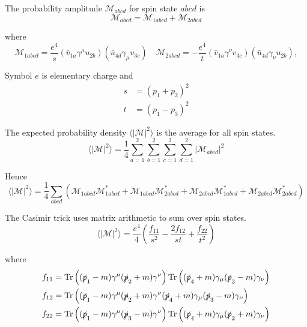 The probability amplitude $\mathcal M_{abcd}$ for spin state $abcd$ is
\begin{equation*}
\mathcal M_{abcd}=\mathcal M_{1abcd}+\mathcal M_{2abcd}
\end{equation*}

where
\begin{equation*}
\mathcal M_{1abcd}=\frac{e^4}{s}(\bar{v}_{1a}\gamma^\mu u_{2b})(\bar{u}_{4d}\gamma_\mu v_{3c})
\quad
\mathcal M_{2abcd}=-\frac{e^4}{t}(\bar{v}_{1a}\gamma^\nu v_{3c})(\bar{u}_{4d}\gamma_\nu u_{2b}),
\end{equation*}

Symbol $e$ is elementary charge and
\begin{align*}
s&=(p_1+p_2)^2
\\
t&=(p_1-p_3)^2
\end{align*}

The expected probability density $\langle|\mathcal M|^2\rangle$
is the average for all spin states.
\begin{equation*}
\langle|\mathcal M|^2\rangle=\frac{1}{4}
\sum_{a=1}^2\sum_{b=1}^2\sum_{c=1}^2\sum_{d=1}^2
|\mathcal M_{abcd}|^2
\end{equation*}

Hence
\begin{equation*}
\langle|\mathcal{M}|^2\rangle=\frac{1}{4}
\sum_{abcd}
\left(
\mathcal M_{1abcd}\mathcal M_{1abcd}^*
+\mathcal M_{1abcd}\mathcal M_{2abcd}^*
+\mathcal M_{2abcd}\mathcal M_{1abcd}^*
+\mathcal M_{2abcd}\mathcal M_{2abcd}^*
\right)
\end{equation*}

The Casimir trick uses matrix arithmetic to sum over spin states.
\begin{equation*}
\langle|\mathcal{M}|^2\rangle
=\frac{e^4}{4}
\left(
\frac{f_{11}}{s^2}-\frac{2f_{12}}{st}+\frac{f_{22}}{t^2}
\right)
\end{equation*}

where
\begin{align*}
f_{11}&=\operatorname{Tr}\left(
(\slashed{p}_1-m)\gamma^\mu(\slashed{p}_2+m)\gamma^\nu
\right)
\mathop{\rm Tr}\left(
(\slashed{p}_4+m)\gamma_\mu(\slashed{p}_3-m)\gamma_\nu
\right)
\\
f_{12}&=\operatorname{Tr}\left(
(\slashed{p}_1-m)\gamma^\mu(\slashed{p}_2+m)\gamma^\nu
(\slashed{p}_4+m)\gamma_\mu(\slashed{p}_3-m)\gamma_\nu
\right)
\\
f_{22}&=\operatorname{Tr}\left(
(\slashed{p}_1-m)\gamma^\mu(\slashed{p}_3-m)\gamma^\nu
\right)
\mathop{\rm Tr}\left(
(\slashed{p}_4+m)\gamma_\mu(\slashed{p}_2+m)\gamma_\nu
\right)
\end{align*}


